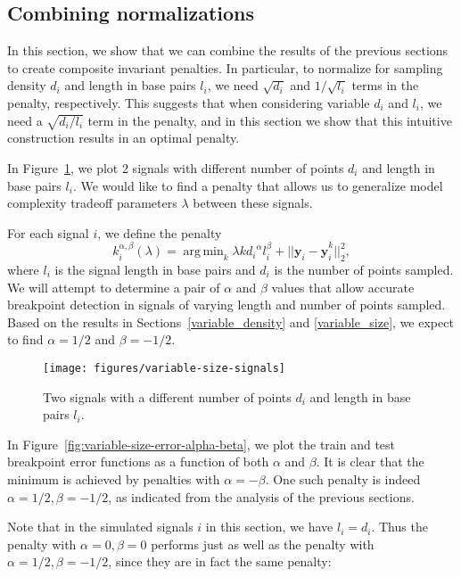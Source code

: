\documentclass{jsfds} %
\DeclareMathOperator*{\argmin}{arg\,min}
\begin{document}
\newpage
\subsection{Combining normalizations}
\label{combining_penalties}
In this section, we show that we can combine the results of the
previous sections to create composite invariant penalties. In
particular, to normalize for sampling density $d_i$ and length in base
pairs $l_i$, we need $\sqrt{d_i}$ and $1/\sqrt{l_i}$ terms in the
penalty, respectively. This suggests that when considering variable
$d_i$ and $l_i$, we need a $\sqrt{d_i/l_i}$ term in the penalty, and
in this section we show that this intuitive construction results in an
optimal penalty.

In Figure~\ref{fig:variable-size-signals}, we plot 2 signals with
different number of points $d_i$ and length in base pairs $l_i$. We
would like to find a penalty that allows us to generalize model
complexity tradeoff parameters $\lambda$ between these signals.

For each signal $i$, we define the penalty
\begin{equation}
  \label{eq:kstar_composite}
  k_i^{\alpha,\beta}(\lambda) = \argmin_k \lambda k {d_i}^\alpha l_i^\beta
  + ||\mathbf y_i - \mathbf{\hat y}_i^k||^2_2,
\end{equation}
where $l_i$ is the signal length in base pairs and $d_i$ is the number
of points sampled. We will attempt to determine a pair of $\alpha$ and
$\beta$ values that allow accurate breakpoint detection in signals of
varying length and number of points sampled. Based on the results in
Sections~\ref{variable_density} and \ref{variable_size}, we expect to
find $\alpha=1/2$ and $\beta=-1/2$.

\begin{figure}[H]
  \centering
\texttt{[image: figures/variable-size-signals]}
  \caption{Two signals with a different number of
    points $d_i$ and length in base pairs $l_i$.}
\label{fig:variable-size-signals}
\end{figure}

\newpage

In Figure~\ref{fig:variable-size-error-alpha-beta}, we plot the train
and test breakpoint error functions as a function of both $\alpha$ and
$\beta$. It is clear that the minimum is achieved by penalties with
$\alpha = -\beta$. One such penalty is indeed $\alpha=1/2,
\beta=-1/2$, as indicated from the analysis of the previous
sections.

Note that in the simulated signals $i$ in this section, we have $l_i =
d_i$. Thus the penalty with $\alpha=0,\beta=0$ performs just as well
as the penalty with $\alpha=1/2,\beta=-1/2$, since they are in fact
the same penalty:
\end{document}
